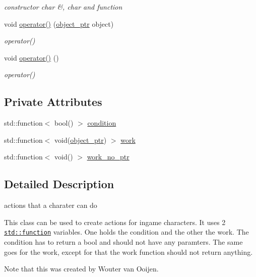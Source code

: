 \begin{DoxyCompactItemize}
\begin{DoxyCompactList}\small\item\em constructor char \&, char and function \end{DoxyCompactList}\item 
void \hyperlink{classaction_ab4f8d0f7552450455977d09a889c18c7}{operator()} (\hyperlink{drawable_8hpp_aab5add95f06d2ba25dbfed8eb07274fa}{object\+\_\+ptr} object)
\begin{DoxyCompactList}\small\item\em operator() \end{DoxyCompactList}\item 
void \hyperlink{classaction_a92c003677656b5b3e6e58b19376e6b04}{operator()} ()
\begin{DoxyCompactList}\small\item\em operator() \end{DoxyCompactList}\end{DoxyCompactItemize}
\subsection*{Private Attributes}
\begin{DoxyCompactItemize}
\item 
std\+::function$<$ bool() $>$ \hyperlink{classaction_a949abf979a5255f54e88a6a4273afebe}{condition}
\item 
std\+::function$<$ void(\hyperlink{drawable_8hpp_aab5add95f06d2ba25dbfed8eb07274fa}{object\+\_\+ptr}) $>$ \hyperlink{classaction_a711a393fce3b3b22930b651e24eda6c3}{work}
\item 
std\+::function$<$ void() $>$ \hyperlink{classaction_a2b895e3240bf7d69ae7f8e3bd7e563d6}{work\+\_\+no\+\_\+ptr}
\end{DoxyCompactItemize}


\subsection{Detailed Description}
actions that a charater can do 

This class can be used to create actions for ingame characters. It uses 2 \href{http://en.cppreference.com/w/cpp/utility/functional/function }{\tt std\+::function} variables. One holds the condition and the other the work. The condition has to return a bool and should not have any paramters. The same goes for the work, except for that the work function should not return anything.

\begin{DoxyNote}{Note}
that this was created by Wouter van Ooijen. 
\end{DoxyNote}


